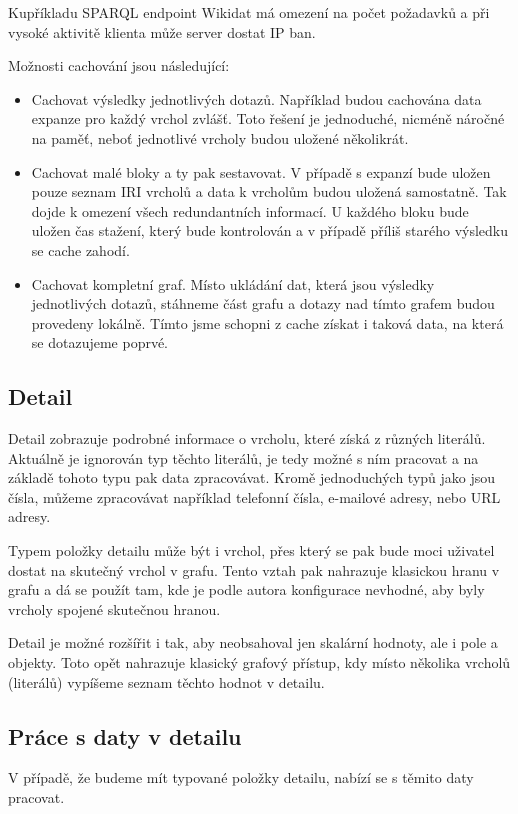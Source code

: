 Kupříkladu SPARQL endpoint Wikidat má omezení na počet požadavků a při vysoké aktivitě klienta může server dostat IP ban.

Možnosti cachování jsou následující:
\begin{itemize}
    \item Cachovat výsledky jednotlivých dotazů. Například budou cachována data expanze pro každý vrchol zvlášť. Toto řešení je jednoduché, nicméně náročné na paměť, neboť jednotlivé vrcholy budou uložené několikrát.
    \item Cachovat malé bloky a ty pak sestavovat. V případě s expanzí bude uložen pouze seznam IRI vrcholů a data k vrcholům budou uložená samostatně. Tak dojde k omezení všech redundantních informací. U každého bloku bude uložen čas stažení, který bude kontrolován a v případě příliš starého výsledku se cache zahodí.
    \item Cachovat kompletní graf. Místo ukládání dat, která jsou výsledky jednotlivých dotazů, stáhneme část grafu a dotazy nad tímto grafem budou provedeny lokálně. Tímto jsme schopni z cache získat i taková data, na která se dotazujeme poprvé.
\end{itemize}

\subsection*{Detail}
Detail zobrazuje podrobné informace o vrcholu, které získá z různých literálů. Aktuálně je ignorován typ těchto literálů, je tedy možné s ním pracovat a na základě tohoto typu pak data zpracovávat. Kromě jednoduchých typů jako jsou čísla, můžeme zpracovávat například telefonní čísla, e-mailové adresy, nebo URL adresy.

Typem položky detailu může být i vrchol, přes který se pak bude moci uživatel dostat na skutečný vrchol v grafu. Tento vztah pak nahrazuje klasickou hranu v grafu a dá se použít tam, kde je podle autora konfigurace nevhodné, aby byly vrcholy spojené skutečnou hranou.

Detail je možné rozšířit i tak, aby neobsahoval jen skalární hodnoty, ale i pole a objekty. Toto opět nahrazuje klasický grafový přístup, kdy místo několika vrcholů (literálů) vypíšeme seznam těchto hodnot v detailu.

\subsection*{Práce s daty v detailu}
V případě, že budeme mít typované položky detailu, nabízí se s těmito daty pracovat.

